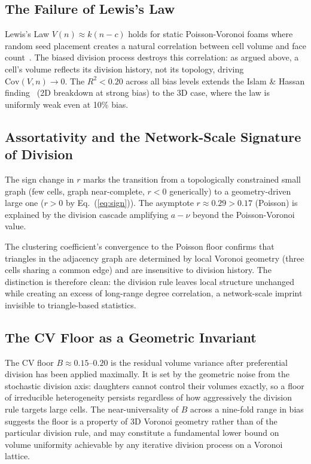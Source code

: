 \documentclass[aps,pre,reprint,amsmath,amssymb,floatfix]{revtex4-2}
\begin{document}
\subsection{The Failure of Lewis's Law}

Lewis's Law $V(n)\approx k(n-c)$ holds for static Poisson-Voronoi foams
where random seed placement creates a natural correlation between cell volume
and face count~\cite{lazar2013}.
The biased division process destroys this correlation: as argued above, a
cell's volume reflects its division history, not its topology, driving
$\mathrm{Cov}(V,n)\to0$.
The $R^2<0.20$ across all bias levels extends the Islam \& Hassan
finding~\cite{islam2014} (2D breakdown at strong bias) to the 3D case, where
the law is uniformly weak even at 10\% bias.

\subsection{Assortativity and the Network-Scale Signature of Division}

The sign change in $r$ marks the transition from a topologically constrained
small graph (few cells, graph near-complete, $r<0$ generically) to a
geometry-driven large one ($r>0$ by Eq.~(\ref{eq:sign})).
The asymptote $r\approx0.29>0.17$ (Poisson) is explained by the division
cascade amplifying $a-\nu$ beyond the Poisson-Voronoi value.

The clustering coefficient's convergence to the Poisson floor confirms that
triangles in the adjacency graph are determined by local Voronoi geometry
(three cells sharing a common edge) and are insensitive to division history.
The distinction is therefore clean: the division rule leaves local structure
unchanged while creating an excess of long-range degree correlation, a
network-scale imprint invisible to triangle-based statistics.

\subsection{The CV Floor as a Geometric Invariant}

The CV floor $B\approx0.15$--$0.20$ is the residual volume variance after
preferential division has been applied maximally.
It is set by the geometric noise from the stochastic division axis: daughters
cannot control their volumes exactly, so a floor of irreducible heterogeneity
persists regardless of how aggressively the division rule targets large cells.
The near-universality of $B$ across a nine-fold range in bias suggests the
floor is a property of 3D Voronoi geometry rather than of the particular
division rule, and may constitute a fundamental lower bound on volume
uniformity achievable by any iterative division process on a Voronoi lattice.
\end{document}
